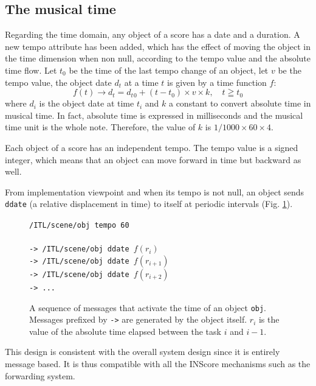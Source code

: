 \documentclass[11pt,a4paper]{article}
\newcommand{\OSC}[1]	{{\fontsize{10pt}{10pt} \selectfont\texttt{#1}}}
\newcommand{\sample}[1]	{\vspace{-0.2em}\begin{center}\colorbox{mygrey}{\begin{minipage}[t]{0.98\columnwidth} {\small \texttt{#1}}\end{minipage}}\end{center}}
\begin{document}
\subsection{The musical time}
Regarding the time domain, any object of a score has a date and a duration. A new tempo attribute has been added, which has the effect of moving the object in the time dimension when non null, according to the tempo value and the absolute time flow. 
Let $t_0$ be the time of the last tempo change of an object, let $v$ be the tempo value, the object date $d_t$ at a time $t$ is given by a time function $f$:
\begin{equation}
	 f(t) \to d_t = d_t{_0} + (t - t_0) \times v \times k , \quad t \geqq t_0
\label{timeeq}
\end{equation}
where $d_i$ is the object date at time $t_i$ and $k$ a constant to convert absolute time in musical time.
In fact, absolute time is expressed in milliseconds and the musical time unit is the whole note. Therefore, the value of $k$ is $1 / 1000 \times 60 \times 4$.

Each object of a score has an independent tempo. The tempo value is a signed integer, which means that an object can move forward in time but backward as well.

From implementation viewpoint and when its tempo is not null, an object sends \OSC{ddate} (a relative displacement in time) to itself at periodic intervals (Fig. \ref{fig:tempo}).

\begin{figure}[h]
   \centering
   \sample{/ITL/scene/obj tempo 60 \\
   \\
-> /ITL/scene/obj ddate $f(r_i)$ \\
-> /ITL/scene/obj ddate $f(r_{i+1})$ \\
-> /ITL/scene/obj ddate $f(r_{i+2})$ \\
-> ...
}
   \caption{A sequence of messages that activate the time of an object \OSC{obj}. Messages prefixed by \OSC{->} are generated by the object itself. $r_{i}$ is the value of the absolute time elapsed between the task $i$ and $i-1$.}
   \label{fig:tempo}
\end{figure}

This design is consistent with the overall system design since it is entirely message based. It is thus compatible with all the INScore mechanisms such as the forwarding system.


\end{document}
